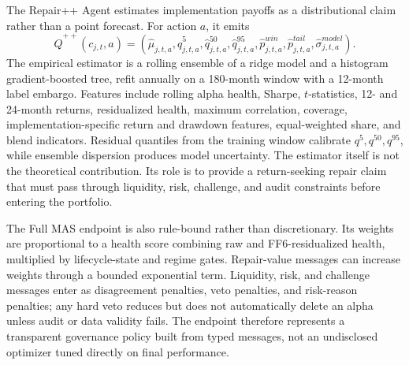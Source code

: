 \documentclass[sigconf,nonacm]{acmart}
\begin{document}
The Repair++ Agent estimates implementation payoffs as a distributional claim rather than a point forecast. For action \(a\), it emits
\begin{equation}
\widehat Q^{++}(c_{j,t},a)=
(\widehat\mu_{j,t,a},\widehat q^{5}_{j,t,a},\widehat q^{50}_{j,t,a},\widehat q^{95}_{j,t,a},
\widehat p^{win}_{j,t,a},\widehat p^{tail}_{j,t,a},\widehat\sigma^{model}_{j,t,a}).
\end{equation}
The empirical estimator is a rolling ensemble of a ridge model and a histogram gradient-boosted tree, refit annually on a 180-month window with a 12-month label embargo. Features include rolling alpha health, Sharpe, \(t\)-statistics, 12- and 24-month returns, residualized health, maximum correlation, coverage, implementation-specific return and drawdown features, equal-weighted share, and blend indicators. Residual quantiles from the training window calibrate \(q^5,q^{50},q^{95}\), while ensemble dispersion produces model uncertainty. The estimator itself is not the theoretical contribution. Its role is to provide a return-seeking repair claim that must pass through liquidity, risk, challenge, and audit constraints before entering the portfolio.

The Full MAS endpoint is also rule-bound rather than discretionary. Its weights are proportional to a health score combining raw and FF6-residualized health, multiplied by lifecycle-state and regime gates. Repair-value messages can increase weights through a bounded exponential term. Liquidity, risk, and challenge messages enter as disagreement penalties, veto penalties, and risk-reason penalties; any hard veto reduces but does not automatically delete an alpha unless audit or data validity fails. The endpoint therefore represents a transparent governance policy built from typed messages, not an undisclosed optimizer tuned directly on final performance.
\end{document}
